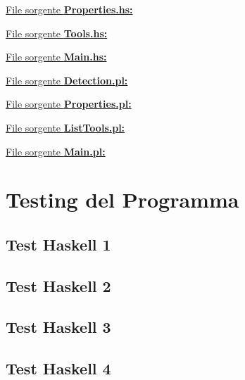 \documentclass{article}
\begin{document}
\underline{File sorgente \textbf{Properties.hs:}}


\underline{File sorgente \textbf{Tools.hs:}}


\lstset{inputencoding=utf8/latin1}
\underline{File sorgente \textbf{Main.hs:}}


\newpage
\raggedright
\underline{File sorgente \textbf{Detection.pl:}}


\underline{File sorgente \textbf{Properties.pl:}}


\underline{File sorgente \textbf{ListTools.pl:}}


\lstset{inputencoding=utf8/latin1}
\underline{File sorgente \textbf{Main.pl:}}

\newpage

\section{Testing del Programma}
\subsection*{Test Haskell 1}

\lstset{inputencoding=utf8/latin1}


\subsection*{Test Haskell 2}

\lstset{inputencoding=utf8/latin1}


\subsection*{Test Haskell 3}

\lstset{inputencoding=utf8/latin1}


\subsection*{Test Haskell 4}
\end{document}
